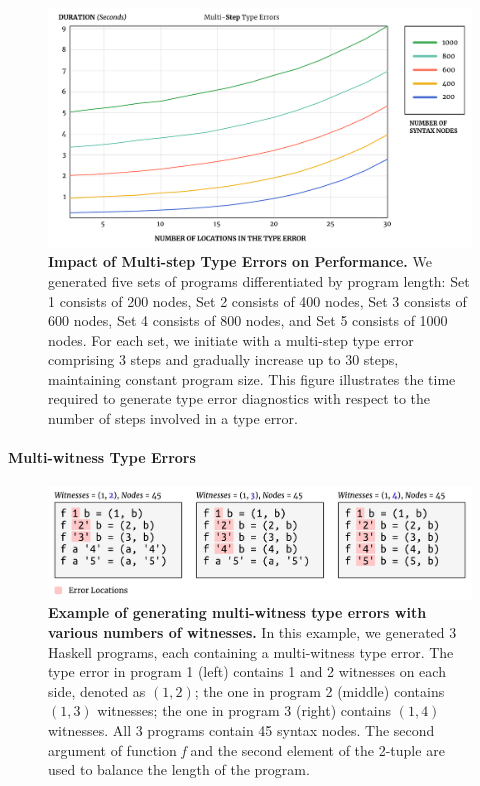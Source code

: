 \documentclass[pdflatex,lineno,sn-nature,Numbered]{sn-jnl}%
\begin{document}
\begin{figure}[ht]
    \centering
    \includegraphics[width=\linewidth]{images/MultiStepDuration}
    \caption{{\bf Impact of Multi-step Type Errors on Performance.} We generated five sets of programs differentiated by program length: Set 1 consists of 200 nodes, Set 2 consists of 400 nodes, Set 3 consists of 600 nodes, Set 4 consists of 800 nodes, and Set 5 consists of 1000 nodes. For each set, we initiate with a multi-step type error comprising 3 steps and gradually increase up to 30 steps, maintaining constant program size. This figure illustrates the time required to generate type error diagnostics with respect to the number of steps involved in a type error. }
    \label{fig:multi-step-time}
\end{figure}

\paragraph{Multi-witness Type Errors}

\begin{figure}[ht]
    \centering
    \includegraphics[width=\linewidth]{images/MultiWitnessMutation}
    \caption{{\bf Example of generating multi-witness type errors with various numbers of witnesses.} In this example, we generated 3 Haskell programs, each containing a multi-witness type error. The type error in program 1 (left) contains 1 and 2 witnesses on each side, denoted as $(1, 2)$; the one in program 2 (middle) contains $(1, 3)$ witnesses; the one in program 3 (right) contains $(1, 4)$ witnesses. All 3 programs contain 45 syntax nodes. The second argument of function {\it f} and the second element of the 2-tuple are used to balance the length of the program.
    } 
    \label{fig:multi-witness-mutation}
\end{figure}
\end{document}
